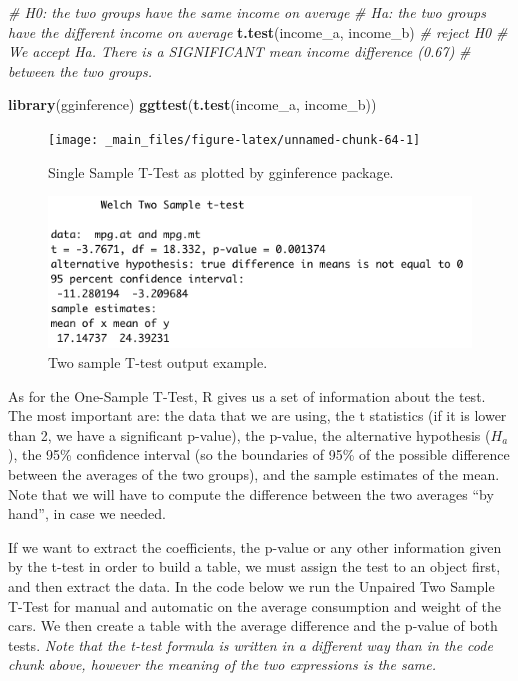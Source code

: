 \documentclass[
]{svmono}
\newenvironment{Shaded}{\begin{snugshade}}{\end{snugshade}}
\newcommand{\CommentTok}[1]{\textcolor[rgb]{0.56,0.35,0.01}{\textit{#1}}}
\newcommand{\FunctionTok}[1]{\textcolor[rgb]{0.13,0.29,0.53}{\textbf{#1}}}
\newcommand{\NormalTok}[1]{#1}
\begin{document}
\begin{Shaded}
\begin{Highlighting}[]
\CommentTok{\# H0: the two groups have the same income on average}
\CommentTok{\# Ha: the two groups have the different income on average}
\FunctionTok{t.test}\NormalTok{(income\_a, income\_b) }\CommentTok{\# reject H0}
\CommentTok{\# We accept Ha. There is a SIGNIFICANT mean income difference (0.67)}
\CommentTok{\# between the two groups.}

\FunctionTok{library}\NormalTok{(gginference)}
\FunctionTok{ggttest}\NormalTok{(}\FunctionTok{t.test}\NormalTok{(income\_a, income\_b))}
\end{Highlighting}
\end{Shaded}

\begin{figure}[H]

{\centering \texttt{[image: \_main\_files/figure-latex/unnamed-chunk-64-1]} 

}

\caption{Single Sample T-Test as plotted by gginference package.}\label{fig:unnamed-chunk-64}
\end{figure}

\begin{figure}[H]

{\centering \includegraphics[width=0.5\linewidth,]{images/Schermata 2022-03-29 alle 16.36.10} 

}

\caption{Two sample T-test output example.}\label{fig:unnamed-chunk-65}
\end{figure}

As for the One-Sample T-Test, R gives us a set of information about the
test. The most important are: the data that we are using, the t
statistics (if it is lower than 2, we have a significant p-value), the
p-value, the alternative hypothesis (\(H_a\)), the 95\% confidence interval
(so the boundaries of 95\% of the possible difference between the
averages of the two groups), and the sample estimates of the mean. Note
that we will have to compute the difference between the two averages ``by
hand'', in case we needed.

If we want to extract the coefficients, the p-value or any other
information given by the t-test in order to build a table, we must
assign the test to an object first, and then extract the data. In the
code below we run the Unpaired Two Sample T-Test for manual and
automatic on the average consumption and weight of the cars. We then
create a table with the average difference and the p-value of both
tests. \emph{Note that the t-test formula is written in a different way than
in the code chunk above, however the meaning of the two expressions is
the same.}
\end{document}
